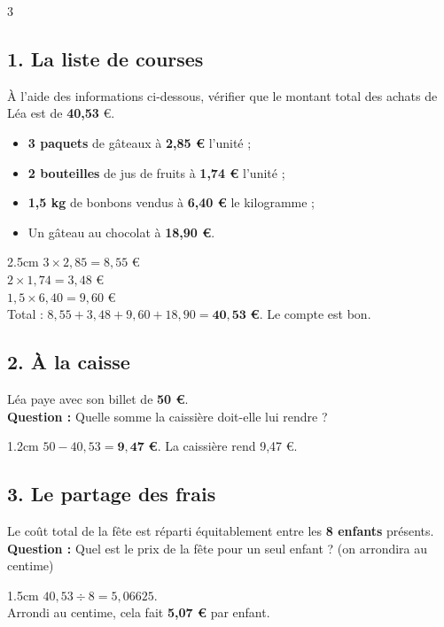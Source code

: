 \documentclass[a4paper]{book}
\begin{document}
{    \begin{exerciceNote}{3}
        \subsection*{1. La liste de courses}
        À l'aide des informations ci-dessous, vérifier que le montant total des achats de Léa est de \textbf{40,53} €.
        \begin{itemize}
            \item \textbf{3 paquets} de gâteaux à \textbf{2,85 €} l'unité ;
            \item \textbf{2 bouteilles} de jus de fruits à \textbf{1,74 €} l'unité ;
            \item \textbf{1,5 kg} de bonbons vendus à \textbf{6,40 €} le kilogramme ;
            \item Un gâteau au chocolat à \textbf{18,90 €}.
        \end{itemize}
        
        \begin{ZoneReponse}{2.5cm}
        $3 \times 2,85 = 8,55$ \euro \\
        $2 \times 1,74 = 3,48$ \euro \\
        $1,5 \times 6,40 = 9,60$ \euro \\
        Total : $8,55 + 3,48 + 9,60 + 18,90 = \mathbf{40,53}$ \textbf{\euro}. Le compte est bon.
        \end{ZoneReponse}
        
        \subsection*{2. À la caisse}
        Léa paye avec son billet de \textbf{50 €}. 
        \\ \textbf{Question :} Quelle somme la caissière doit-elle lui rendre ?
        
        \begin{ZoneReponse}{1.2cm}
        $50 - 40,53 = \mathbf{9,47}$ \textbf{\euro}. La caissière rend 9,47 \euro.
        \end{ZoneReponse}
        
        \subsection*{3. Le partage des frais}
        
        Le coût total de la fête est réparti équitablement entre les \textbf{8 enfants} présents.
        \\ \textbf{Question :} Quel est le prix de la fête pour un seul enfant ? (on arrondira au centime)
        
        \begin{ZoneReponse}{1.5cm}
        $40,53 \div 8 = 5,06625$. \\
        Arrondi au centime, cela fait \textbf{5,07 \euro} par enfant.
        \end{ZoneReponse}
    \end{exerciceNote}
}
\end{document}
